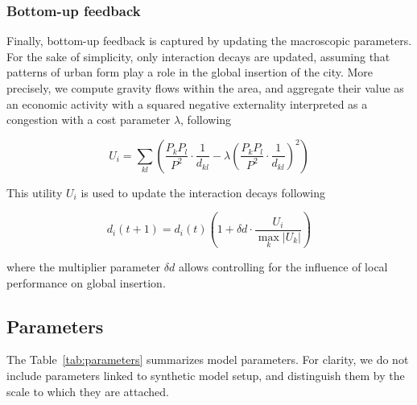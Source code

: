 \documentclass[ijgi,article,submit,moreauthors,pdftex]{Definitions/mdpi}
\begin{document}
	

\subsubsection{Bottom-up feedback}
	
Finally, bottom-up feedback is captured by updating the macroscopic parameters. For the sake of simplicity, only interaction decays are updated, assuming that patterns of urban form play a role in the global insertion of the city. More precisely, we compute gravity flows within the area, and aggregate their value as an economic activity with a squared negative externality interpreted as a congestion with a cost parameter $\lambda$, following
	
\begin{equation}
\label{eq:eq6}
		U_i = \sum_{kl} \left( \frac{P_k P_l}{P^2} \cdot \frac{1}{d_{kl}} - \lambda \left(\frac{P_k P_l}{P^2} \cdot \frac{1}{d_{kl}}\right)^2 \right)
\end{equation}
	
This utility $U_i$ is used to update the interaction decays following
	
\begin{equation}
\label{eq:eq7}
	d_i (t+1) = d_i (t) \left( 1 + \delta d \cdot \frac{U_i}{\max_k \left|U_k\right|} \right)
\end{equation}

where the multiplier parameter $\delta d$ allows controlling for the influence of local performance on global insertion.





\subsection{Parameters}

The Table~\ref{tab:parameters} summarizes model parameters. For clarity, we do not include parameters linked to synthetic model setup, and distinguish them by the scale to which they are attached.
\end{document}
